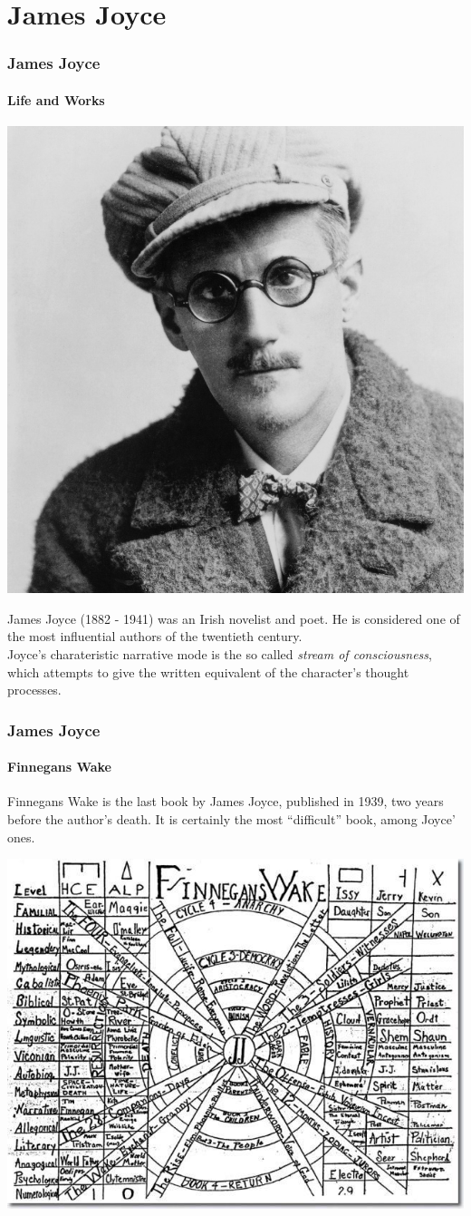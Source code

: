 \documentclass{beamer}
\begin{document}
	\section{James Joyce}
		\begin{frame}
			\frametitle{James Joyce}
			\framesubtitle{Life and Works}
			\begin{center}
				\includegraphics[width=0.4\linewidth]{"../Inglese - Joyce/james-joyce"}
			\end{center}
			James Joyce (1882 - 1941) was an Irish novelist and poet. He is considered one of the most influential authors of the twentieth century.\\
			Joyce's charateristic narrative mode is the so called \textit{stream of consciousness}, which attempts to give the written equivalent of the character's thought processes. 
		\end{frame}
		\begin{frame}
			\frametitle{James Joyce}
			\framesubtitle{Finnegans Wake}
			Finnegans Wake is the last book by James Joyce, published in 1939, two years before the author's death. It is certainly the most ``difficult'' book, among Joyce' ones.
			\begin{center}
				\includegraphics[width=0.6\linewidth]{"../Inglese - Joyce/finnegans_scheme"}
			\end{center}
		\end{frame}
\end{document}
